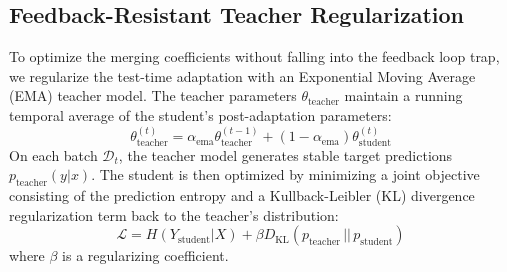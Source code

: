 \documentclass{article}
\theoremstyle{plain}
\theoremstyle{definition}
\theoremstyle{remark}
\begin{document}
\subsection{Feedback-Resistant Teacher Regularization}
To optimize the merging coefficients without falling into the feedback loop trap, we regularize the test-time adaptation with an Exponential Moving Average (EMA) teacher model. The teacher parameters $\theta_{\text{teacher}}$ maintain a running temporal average of the student's post-adaptation parameters:
\begin{equation}
    \theta_{\text{teacher}}^{(t)} = \alpha_{\text{ema}} \theta_{\text{teacher}}^{(t-1)} + (1 - \alpha_{\text{ema}}) \theta_{\text{student}}^{(t)}
\end{equation}
On each batch $\mathcal{D}_t$, the teacher model generates stable target predictions $p_{\text{teacher}}(y|x)$. The student is then optimized by minimizing a joint objective consisting of the prediction entropy and a Kullback-Leibler (KL) divergence regularization term back to the teacher's distribution:
\begin{equation}
    \mathcal{L} = H(Y_{\text{student}} | X) + \beta D_{\text{KL}}\left( p_{\text{teacher}} \,||\, p_{\text{student}} \right)
\end{equation}
where $\beta$ is a regularizing coefficient.
\end{document}
